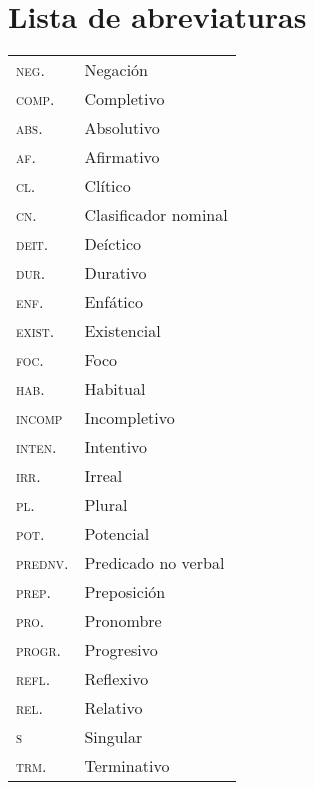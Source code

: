 \section*{Lista de abreviaturas}

\begin{table}[htbp]
      \begin{tabular}{ll}
      \textsc{neg.} & Negación \\
      \textsc{comp.} & Completivo \\
      \textsc{abs.} & Absolutivo \\
      \textsc{af.} & Afirmativo \\
      \textsc{cl.} & Clítico \\
      \textsc{cn.} & Clasificador nominal \\
      \textsc{deit.} & Deíctico \\
      \textsc{dur.} & Durativo \\
      \textsc{enf.} & Enfático \\
      \textsc{exist.} & Existencial \\
      \textsc{foc.} & Foco \\
      \textsc{hab.} & Habitual \\
      \textsc{incomp} & Incompletivo \\
      \textsc{inten.} & Intentivo \\
      \textsc{irr.} & Irreal \\
      \textsc{pl.} & Plural \\
      \textsc{pot.} & Potencial \\
      \textsc{prednv.} & Predicado no verbal \\
      \textsc{prep.} & Preposición \\
      \textsc{pro.} & Pronombre \\
      \textsc{progr.} & Progresivo \\
      \textsc{refl.} & Reflexivo \\
      \textsc{rel.} & Relativo \\
      \textsc{s} & Singular \\
      \textsc{trm.} & Terminativo 
      \end{tabular}%
  \end{table}%
  